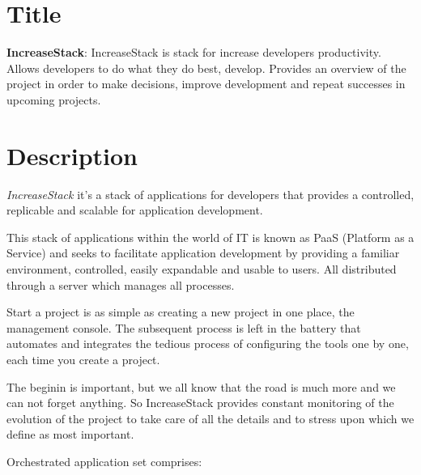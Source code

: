 \documentclass[11pt]{scrartcl}
\begin{document}
\section{Title}

\textbf{IncreaseStack}: IncreaseStack is stack for increase developers productivity. Allows developers to do what they do best, develop. Provides an overview of the project in order to make decisions, improve development and repeat successes in upcoming projects.

\section{Description}

\emph{IncreaseStack} it's a stack of applications for developers that provides a controlled, replicable and scalable for application development. 

\par This stack of applications within the world of IT is known as PaaS (Platform as a Service) and seeks to facilitate application development by providing a familiar environment, controlled, easily expandable and usable to users. All distributed through a server which manages all processes.

\par Start a project is as simple as creating a new project in one place, the management console. The subsequent process is left in the battery that automates and integrates the tedious process of configuring the tools one by one, each time you create a project.

\par The beginin is important, but we all know that the road is much more and we can not forget anything. So IncreaseStack provides constant monitoring of the evolution of the project to take care of all the details and to stress upon which we define as most important.

\par Orchestrated application set comprises:
\end{document}
